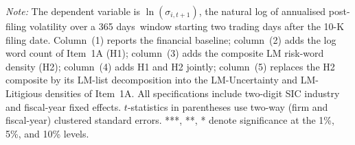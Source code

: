 \begin{table}[htbp]
\begin{tabular}{lccccc}
\bottomrule
\end{tabular}
\par\smallskip
\begin{flushleft}\footnotesize
\textit{Note:} The dependent variable is $\ln(\sigma_{i,t+1})$, the natural log of annualised post-filing volatility over a 365 days~window starting two trading days after the 10-K filing date. Column~(1) reports the financial baseline; column~(2) adds the log word count of Item~1A (H1); column~(3) adds the composite LM risk-word density (H2); column~(4) adds H1 and H2 jointly; column~(5) replaces the H2 composite by its LM-list decomposition into the LM-Uncertainty and LM-Litigious densities of Item~1A. All specifications include two-digit SIC industry and fiscal-year fixed effects. $t$-statistics in parentheses use two-way (firm and fiscal-year) clustered standard errors. ***, **, * denote significance at the 1\%, 5\%, and 10\% levels.
\end{flushleft}
\end{table}